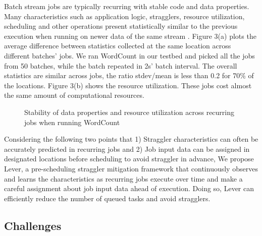 \documentclass[10pt,conference,compsocconf,letterpaper]{IEEEtran}
\begin{document}
  Batch stream jobs are typically recurring with stable code and data properties. Many characteristics such as application logic, stragglers, resource utilization, scheduling and other operations present statistically similar to the previous execution when running on newer data of the same stream \cite{Agarwal}. Figure 3(a) plots the average difference between statistics collected at the same location across different batches' jobs. We ran WordCount in our testbed and picked all the jobs from 50 batches, while the batch repeated in 2s' batch interval. The overall statistics are similar across jobs, the ratio stdev/mean is less than 0.2 for 70\% of the locations. Figure 3(b) shows the resource utilization. These jobs cost almost the same amount of computational resources.
  \begin{figure}[htbp]
    \centering
    \caption{Stability of data properties and resource utilization across recurring jobs when running WordCount}
    \label{Fig. 3:}
  \end{figure}

  Considering the following two points that 1) Straggler characteristics can often be accurately predicted in recurring jobs and 2) Job input data can be assigned in designated locations before scheduling to avoid straggler in advance, We propose Lever, a pre-scheduling straggler mitigation framework that continuously observes and learns the characteristics as recurring jobs execute over time and make a careful assignment about job input data ahead of execution. Doing so, Lever can efficiently reduce the number of queued tasks and avoid stragglers.

\subsection{Challenges}
\end{document}
